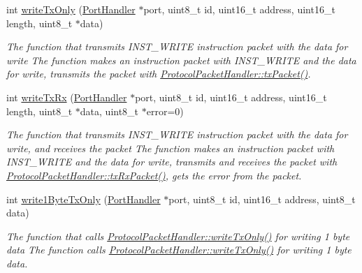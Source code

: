 \begin{DoxyCompactItemize}
int \hyperlink{classmercury_1_1_protocol_packet_handler_adf6e96b412135484dac0ff7ff9c2bf36}{write\+Tx\+Only} (\hyperlink{classmercury_1_1_port_handler}{Port\+Handler} $\ast$port, uint8\+\_\+t id, uint16\+\_\+t address, uint16\+\_\+t length, uint8\+\_\+t $\ast$data)
\begin{DoxyCompactList}\small\item\em The function that transmits I\+N\+S\+T\+\_\+\+W\+R\+I\+TE instruction packet with the data for write  The function makes an instruction packet with I\+N\+S\+T\+\_\+\+W\+R\+I\+TE and the data for write,  transmits the packet with \hyperlink{classmercury_1_1_protocol_packet_handler_a245f01395d9684bc58788e8a06de3ffc}{Protocol\+Packet\+Handler\+::tx\+Packet()}. \end{DoxyCompactList}\item 
int \hyperlink{classmercury_1_1_protocol_packet_handler_a13921f2ddae0c1f1f7ac3669d1a15470}{write\+Tx\+Rx} (\hyperlink{classmercury_1_1_port_handler}{Port\+Handler} $\ast$port, uint8\+\_\+t id, uint16\+\_\+t address, uint16\+\_\+t length, uint8\+\_\+t $\ast$data, uint8\+\_\+t $\ast$error=0)
\begin{DoxyCompactList}\small\item\em The function that transmits I\+N\+S\+T\+\_\+\+W\+R\+I\+TE instruction packet with the data for write, and receives the packet  The function makes an instruction packet with I\+N\+S\+T\+\_\+\+W\+R\+I\+TE and the data for write,  transmits and receives the packet with \hyperlink{classmercury_1_1_protocol_packet_handler_a68b02f23af616886d0795ea12debd613}{Protocol\+Packet\+Handler\+::tx\+Rx\+Packet()},  gets the error from the packet. \end{DoxyCompactList}\item 
int \hyperlink{classmercury_1_1_protocol_packet_handler_a5552ae2bbb808624a5f8853a6c350c6a}{write1\+Byte\+Tx\+Only} (\hyperlink{classmercury_1_1_port_handler}{Port\+Handler} $\ast$port, uint8\+\_\+t id, uint16\+\_\+t address, uint8\+\_\+t data)
\begin{DoxyCompactList}\small\item\em The function that calls \hyperlink{classmercury_1_1_protocol_packet_handler_adf6e96b412135484dac0ff7ff9c2bf36}{Protocol\+Packet\+Handler\+::write\+Tx\+Only()} for writing 1 byte data  The function calls \hyperlink{classmercury_1_1_protocol_packet_handler_adf6e96b412135484dac0ff7ff9c2bf36}{Protocol\+Packet\+Handler\+::write\+Tx\+Only()} for writing 1 byte data. \end{DoxyCompactList}\item 

\end{DoxyCompactItemize}
